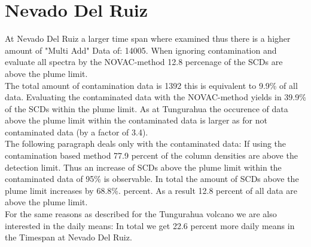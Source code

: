 \documentclass  [
  paper    = a4,
  BCOR     = 10mm,
  twoside,
  fontsize = 12pt,
  fleqn,
  toc      = bibnumbered,
  toc      = listofnumbered,
  numbers  = noendperiod,
  headings = normal,
  listof   = leveldown,
  version  = 3.03
]                                       {scrreprt}
\begin{document}
	


\section{Nevado Del Ruiz}
At Nevado Del Ruiz a larger time span where examined thus there is a higher amount of "Multi Add" Data of: 14005.
When ignoring contamination and evaluate all spectra by the NOVAC-method 12.8 percenage of the  SCDs are above the plume limit.\\
The total amount of contamination data is 1392 this is equivalent to 9.9\% of all data. Evaluating the contaminated data with the NOVAC-method yields in 39.9\% of the  SCDs within the plume limit. As at Tungurahua the occurence of data above the plume limit within the contaminated data is larger as for not contaminated data (by a factor of 3.4).\\
The following paragraph deals only with the contaminated data:
If using the contamination based method 77.9 percent of the  column densities are above the detection limit. Thus an increase of  SCDs above the plume limit within the contaminated data of 95\% is observable. In total the amount of  SCDs above the plume limit increases by  68.8\%. percent. As a result 12.8 percent of all data are above the plume limit.\\
For the same reasons as described for the Tungurahua volcano we are also interested in the daily means: In total we get 22.6 percent more daily means in the Timespan at Nevado Del Ruiz.\\
\\
\FloatBarrier

%
%
%
\end{document}
